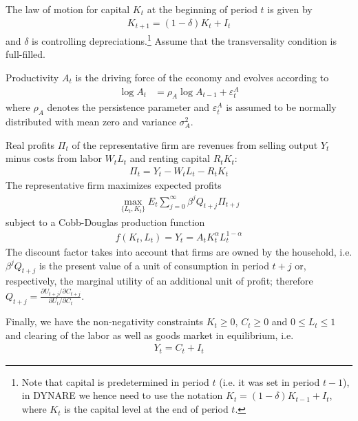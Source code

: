 \documentclass[a4paper]{scrartcl}
\begin{document}
	The law of motion for capital $K_t$ at the beginning of period $t$ is given by
	\begin{align*}
	K_{t+1} = (1-\delta)K_t + I_t
	\end{align*}
	and $\delta$ is controlling depreciations.\footnote{Note that capital is predetermined in period $t$ (i.e. it was set in period $t-1$), in DYNARE we hence need to use the notation $K_t = (1-\delta)K_{t-1} + I_t$, where $K_t$ is the capital level at the end of period $t$.} Assume that the transversality condition is full-filled.
	
	Productivity $A_t$ is the driving force of the economy and evolves according to
	\begin{align*}
		\log{A_{t}} &= \rho_A \log{A_{t-1}}  + \varepsilon_t^A
	\end{align*}
	where $\rho_A$ denotes the persistence parameter and $\varepsilon_t^A$ is assumed to be normally distributed with mean zero and variance $\sigma_A^2$.
	
	Real profits $\Pi_t$ of the representative firm are revenues from selling output $Y_t$ minus costs from labor $W_t L_t$ and renting capital $R_t K_t$:
	\begin{align*}
	\Pi_t = Y_{t} - W_{t} L_{t} - R_{t} K_{t}
	\end{align*}	
	The representative firm maximizes expected profits
	\begin{align*}
		\underset{\{L_{t},K_{t}\}}{\max} E_t \sum_{j=0}^{\infty} \beta^j Q_{t+j}\Pi_{t+j}
	\end{align*}
	subject to a Cobb-Douglas production function
	\begin{align*}
	f(K_t, L_t) = Y_t = A_t K_t^\alpha L_t^{1-\alpha}
	\end{align*}
	The discount factor takes into account that firms are owned by the household, i.e. $\beta^j Q_{t+j}$ is the present value of a unit of consumption in period $t+j$ or, respectively, the marginal utility of an additional unit of profit; therefore $Q_{t+j}=\frac{\partial U_{t+j}/\partial C_{t+j}}{\partial U_{t}/\partial C_{t}}$.
	
	Finally, we have the non-negativity constraints	$K_t \geq0$, $C_t \geq 0$ and $0\leq L_t \leq 1$ and clearing of the labor as well as goods market in equilibrium, i.e.
	\begin{align*}
	Y_t = C_t + I_t
	\end{align*}
\end{document}
